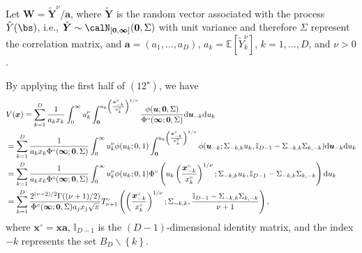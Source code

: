 \documentclass[12pt]{article}
\begin{document}
Let $\bm W= \tilde{\bm Y}^{\nu} / \bm a$, where $\tilde{\bm Y}$ is the random vector associated with the process $\tilde{Y}(\bs)$, i.e., $\tilde{\bm Y} \sim \calN_{\left[ \bm 0, \bm \infty\right]}(\bm 0, \Sigma)$ with unit variance and therefore $\Sigma$ represent the correlation matrix, and $\bm a = (a_1, \ldots, a_D)$, $a_k=\mathbb E[\tilde Y_k^\nu]$, $k=1, \ldots, D$, and $\nu>0$.

By applying the first half of $(12^\star)$, we have 
\begin{align}
& V(\bm x) = \sum_{k=1}^D\frac{1}{a_kx_k}\int_0^\infty u_k^\nu \int_{\bm 0}^{u_k \left(\frac{\bm x_{-k}^\circ}{x_{k}^\circ}\right)^{1/\nu}} \frac{\phi(\bm u;\bm 0, \Sigma)}{\Phi^\circ(\bm \infty;\bm 0, \Sigma)}\text d \bm u_{-k}\text d u_k \nonumber \\ 
&=\sum_{k=1}^D\frac{1}{a_k x_k \Phi^\circ(\bm \infty;\bm 0, \Sigma)}\int_0^\infty u_k^\nu \phi(u_k;0, 1) \int_{\bm 0}^{u_k\left(\frac{\bm x_{-k}^\circ}{x_k^\circ}\right)^{1/\nu}}\phi(\bm u_{-k}; \Sigma_{-k,k}u_k, \mathbb{I}_{D-1}-\Sigma_{-k,k}\Sigma_{k,-k})\text d \bm u_{-k}\text d u_k \nonumber \\ 
&=\sum_{k=1}^D\frac{1}{a_kx_k \Phi^\circ(\bm \infty;\bm 0, \Sigma)}\int_0^\infty u_k^\nu \phi(u_k; 0, 1) \Phi^\circ\left(u_k\left(\frac{\bm x_{-k}^\circ}{x_k^\circ}\right)^{1/\nu};\Sigma_{-k,k}u_k,\mathbb{I}_{D-1} -\Sigma_{-k,k}\Sigma_{k,-k}\right)\text d u_k \nonumber \\  
&=\sum_{k=1}^D \frac{2^{(\nu-2)/2} \Gamma((\nu+1)/2)}{\Phi^\circ(\bm \infty;\bm 0, \Sigma) a_jx_j \sqrt{\pi}} T_{\nu+1}^\circ\left(\left(\frac{\bm x_{-k}^\circ}{x_k^\circ}\right)^{1/\nu};\Sigma_{-k,k},\frac{\mathbb{I}_{D-1}-\Sigma_{-k,k}\Sigma_{k,-k}}{\nu+1}\right)
\label{eq:truncated_extremal_t_V},
\end{align}
where $\bm x^\circ = \bm x \bm a$, $\mathbb{I}_{D-1}$ is the $(D-1)$-dimensional identity matrix, and the index $-k$ represents the set $B_D \backslash \left\{ k\right\}$.
\end{document}
